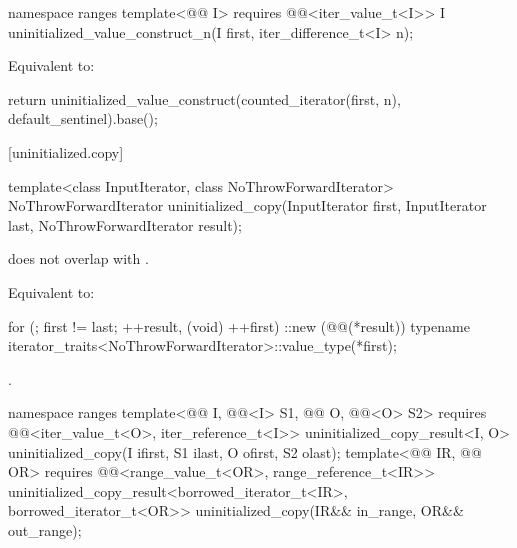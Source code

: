 %
\begin{itemdecl}
namespace ranges {
  template<@@ I>
    requires @@<iter_value_t<I>>
    I uninitialized_value_construct_n(I first, iter_difference_t<I> n);
}
\end{itemdecl}

\begin{itemdescr}
\pnum
\effects
Equivalent to:
\begin{codeblock}
return uninitialized_value_construct(counted_iterator(first, n),
                                     default_sentinel).base();
\end{codeblock}
\end{itemdescr}

[uninitialized.copy]{}

%
\begin{itemdecl}
template<class InputIterator, class NoThrowForwardIterator>
  NoThrowForwardIterator uninitialized_copy(InputIterator first, InputIterator last,
                                            NoThrowForwardIterator result);
\end{itemdecl}

\begin{itemdescr}
\pnum
\expects
{} does not overlap with .

\pnum
\effects
Equivalent to:
\begin{codeblock}
for (; first != last; ++result, (void) ++first)
  ::new (@@(*result))
    typename iterator_traits<NoThrowForwardIterator>::value_type(*first);
\end{codeblock}

\pnum
\returns
{}.
\end{itemdescr}

%
\begin{itemdecl}
namespace ranges {
  template<@@ I, @@<I> S1,
           @@ O, @@<O> S2>
    requires @@<iter_value_t<O>, iter_reference_t<I>>
    uninitialized_copy_result<I, O>
      uninitialized_copy(I ifirst, S1 ilast, O ofirst, S2 olast);
  template<@@ IR, @@ OR>
    requires @@<range_value_t<OR>, range_reference_t<IR>>
    uninitialized_copy_result<borrowed_iterator_t<IR>, borrowed_iterator_t<OR>>
      uninitialized_copy(IR&& in_range, OR&& out_range);
}
\end{itemdecl}

